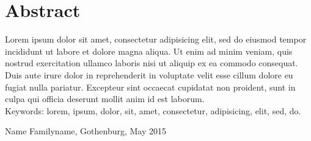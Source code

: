 \thispagestyle{plain}			%
\section*{Abstract}
Lorem ipsum dolor sit amet, consectetur adipisicing elit, sed do eiusmod tempor incididunt ut labore et dolore magna aliqua. Ut enim ad minim veniam, quis nostrud exercitation ullamco laboris nisi ut aliquip ex ea commodo consequat. Duis aute irure dolor in reprehenderit in voluptate velit esse cillum dolore eu fugiat nulla pariatur. Excepteur sint occaecat cupidatat non proident, sunt in culpa qui officia deserunt mollit anim id est laborum.\\[0.5cm]

Keywords: lorem, ipsum, dolor, sit, amet, consectetur, adipisicing, elit, sed, do.

\begin{flushright}
Name Familyname, Gothenburg, May 2015
\end{flushright}